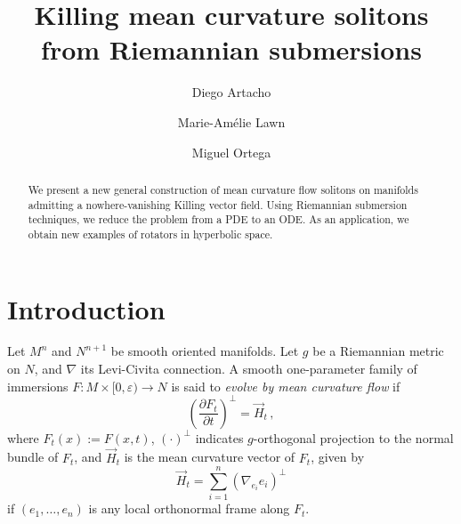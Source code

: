 \documentclass[oneside,12pt]{amsart}
\theoremstyle{definition}
\begin{document}
\title{Killing mean curvature solitons from Riemannian submersions}

\author{Diego Artacho}
\address{D.~Artacho: Department of Mathematics, Faculty of Natural Sciences, Imperial College London, 180 Queen's Gate London SW72AZ, UK}

\author{Marie-Am\'{e}lie Lawn}
\address{M.-A.~Lawn: Department of Mathematics, Faculty of Natural Sciences, Imperial College London, 180 Queen's Gate London SW72AZ, UK}

\author{Miguel Ortega}
\address{M.~Ortega: Institute of Mathematics, Department of Geometry and Topology, Faculty of Sciences, Campus de Fuentenueva, 18079 Granada, Spain}

\begin{abstract}
   We present a new general construction of mean curvature flow solitons on manifolds admitting a nowhere-vanishing Killing vector field. Using Riemannian submersion techniques, we reduce the problem from a PDE to an ODE. As an application, we obtain new examples of rotators in hyperbolic space. 
\end{abstract}

\maketitle

\section{Introduction} \label{sec:intro}

Let $M^n$ and $N^{n+1}$ be smooth oriented manifolds. Let $g$ be a Riemannian metric on $N$, and $\nabla$ its Levi-Civita connection. A smooth one-parameter family of immersions $F \colon M \times [0, \varepsilon) \to N$ is said to \emph{evolve by mean curvature flow} if
\begin{equation}\label{eq:mcf}
\left( \frac{\partial F_t}{\partial t} \right)^{\perp} = \vec{H}_t \, ,
\end{equation}
where $F_t (x) := F(x,t)$, $(\cdot)^{\perp}$ indicates $g$-orthogonal projection to the normal bundle of $F_t$, and $\vec{H}_t$ is the mean curvature vector of $F_t$, given by 
\begin{equation*}
\vec{H}_t = \sum_{i=1}^{n} \left(\nabla_{e_i} e_i\right)^{\perp} 
\end{equation*}
if $(e_1 , \dots , e_n)$ is any local orthonormal frame along $F_t$. 
\end{document}
